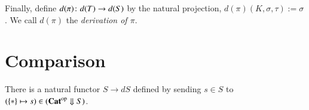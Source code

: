 \documentclass{amsart}
\def\Down{\Downarrow}
\begin{document}
Finally, define $d(\pi)\colon d(T)\rightarrow d(S)$ by the natural projection, $d(\pi)(K,\sigma,\tau):=\sigma$.  We call $d(\pi)$ the {\em derivation of $\pi$}.

\section{Comparison}

There is a natural functor $S\to dS$ defined by sending $s\in S$ to $(\singleton\mapsto s)\in(\Cat\op\Down S)$.



\end{document}
